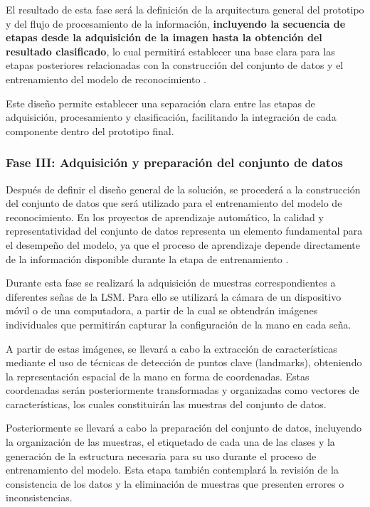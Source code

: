 	El resultado de esta fase será la definición de la arquitectura general del
	prototipo y del flujo de procesamiento de la información, \textbf{incluyendo la secuencia de etapas desde la adquisición de la imagen hasta la obtención del resultado clasificado}, lo cual permitirá
	establecer una base clara para las etapas posteriores relacionadas con la
	construcción del conjunto de datos y el entrenamiento del modelo de
	reconocimiento \cite{mall2018,jalote2005}.
	
	Este diseño permite establecer una separación clara entre las etapas de adquisición, procesamiento y clasificación, facilitando la integración de cada componente dentro del prototipo final.
	
	\subsubsection{Fase III: Adquisición y preparación del conjunto de datos}
	
	Después de definir el diseño general de la solución, se procederá a la
	construcción del conjunto de datos que será utilizado para el entrenamiento
	del modelo de reconocimiento. En los proyectos de aprendizaje automático,
	la calidad y representatividad del conjunto de datos representa un elemento
	fundamental para el desempeño del modelo, ya que el proceso de aprendizaje
	depende directamente de la información disponible durante la etapa de
	entrenamiento \cite{goodfellow2016,geron2019}.
	
	Durante esta fase se realizará la adquisición de muestras correspondientes a
	diferentes señas de la LSM. Para ello se utilizará la
	cámara de un dispositivo móvil o de una computadora, a partir de la cual se
	obtendrán imágenes individuales que permitirán capturar la configuración de la
	mano en cada seña.
	
	A partir de estas imágenes, se llevará a cabo la extracción de características
	mediante el uso de técnicas de detección de puntos clave (landmarks), obteniendo
	la representación espacial de la mano en forma de coordenadas. Estas
	coordenadas serán posteriormente transformadas y organizadas como vectores de
	características, los cuales constituirán las muestras del conjunto de datos.
	
	Posteriormente se llevará a cabo la preparación del conjunto de datos,
	incluyendo la organización de las muestras, el etiquetado de cada una de las
	clases y la generación de la estructura necesaria para su uso durante el
	proceso de entrenamiento del modelo. Esta etapa también contemplará la
	revisión de la consistencia de los datos y la eliminación de muestras que
	presenten errores o inconsistencias.
	
